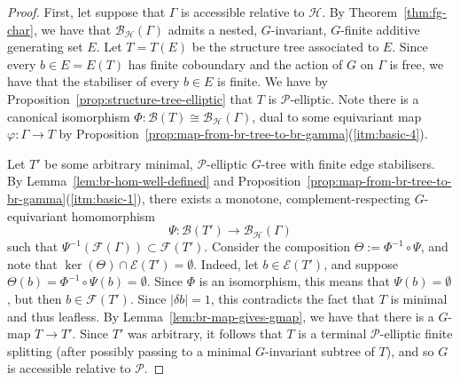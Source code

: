 \documentclass[11pt,a4paper]{amsart}
\theoremstyle{definition}
\newcommand{\per}{\mathcal{H}}
\newcommand{\br}{{\mathscr{B}}}
\begin{document}
\begin{proof}
    First, let suppose that $\Gamma$ is accessible relative to $\per$. By Theorem~\ref{thm:fg-char}, we have that $\br_\per(\Gamma)$ admits a nested, $G$-invariant, $G$-finite additive generating set $E$. Let $T = T(E)$ be the structure tree associated to $E$. 
    Since every $b \in E = E(T)$ has finite coboundary and the action of $G$ on $\Gamma$ is free, we have that the stabiliser of every $b \in E$ is finite. We have by Proposition~\ref{prop:structure-tree-elliptic} that $T$ is $\mathcal P$-elliptic. Note there is a canonical isomorphism $\Phi : \br(T) \cong \br_\per(\Gamma)$, dual to some equivariant map $\varphi: \Gamma \to T$ by Proposition~\ref{prop:map-from-br-tree-to-br-gamma}(\ref{itm:basic-4}).
    
    Let $T'$ be some arbitrary minimal, $\mathcal P$-elliptic $G$-tree with finite edge stabilisers. By Lemma~\ref{lem:br-hom-well-defined} and Proposition~\ref{prop:map-from-br-tree-to-br-gamma}(\ref{itm:basic-1}), there exists a monotone, complement-respecting $G$-equivariant homomorphism 
    $$
    \Psi : \br(T') \to \br_\per(\Gamma)
    $$
    such that $\Psi^{-1}(\mathscr F(\Gamma)) \subset \mathscr F(T')$. 
    Consider the composition $\Theta := \Phi^{-1} \circ \Psi$, and note that $\ker(\Theta) \cap \mathscr E(T') = \emptyset$. Indeed, let $b \in \mathscr E(T')$, and suppose $\Theta(b) = \Phi^{-1} \circ \Psi(b) = \emptyset$. Since $\Phi$ is an isomorphism, this means that $\Psi(b) = \emptyset$, but then $b \in \mathscr F(T')$. Since $|\delta b| = 1$, this contradicts the fact that $T$ is minimal and thus leafless. 
    By Lemma~\ref{lem:br-map-gives-gmap}, we have that there is a $G$-map $T \to T'$. Since $T'$ was arbitrary, it follows that $T$ is a terminal $\mathcal P$-elliptic finite splitting (after possibly passing to a minimal $G$-invariant subtree of $T$), and so $G$ is accessible relative to $\mathcal P$. 


\end{proof}
\end{document}
